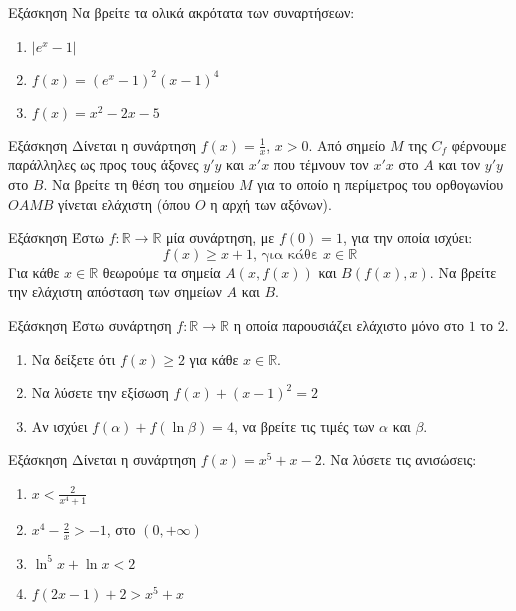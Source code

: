 \documentclass[greek]{beamer}
\begin{document}
\begin{frame}{Εξάσκηση}
 Να βρείτε τα ολικά ακρότατα των συναρτήσεων:
 \begin{enumerate}
  \item $|e^x-1|$ \pause
  \item $f(x)=(e^x-1)^2(x-1)^4$ \pause
  \item $f(x)=x^2-2x-5$
 \end{enumerate}
\end{frame}

\begin{frame}{Εξάσκηση}
 Δίνεται η συνάρτηση $f(x)=\frac{1}{x}$, $x>0$. Από σημείο $Μ$ της $C_f$ φέρνουμε παράλληλες ως προς τους άξονες $y'y$ και $x'x$ που τέμνουν τον $x'x$ στο $Α$ και τον $y'y$ στο $Β$. Να βρείτε τη θέση του σημείου $Μ$ για το οποίο η περίμετρος του ορθογωνίου $ΟΑΜΒ$ γίνεται ελάχιστη (όπου $Ο$ η αρχή των αξόνων).
\end{frame}

\begin{frame}{Εξάσκηση}
 Έστω $f:\mathbb{R}\to\mathbb{R}$ μία συνάρτηση, με $f(0)=1$, για την οποία ισχύει:
 $$f(x)\ge x+1 \text{, για κάθε } x\in\mathbb{R}$$
 Για κάθε $x\in\mathbb{R}$ θεωρούμε τα σημεία $Α(x,f(x))$ και $Β(f(x),x)$. Να βρείτε την ελάχιστη απόσταση των σημείων $Α$ και $Β$.
\end{frame}

\begin{frame}{Εξάσκηση}
 Έστω συνάρτηση $f:\mathbb{R}\to \mathbb{R}$ η οποία παρουσιάζει ελάχιστο μόνο στο $1$ το $2$.
 \begin{enumerate}
  \item Να δείξετε ότι $f(x)\ge 2$ για κάθε $x\in\mathbb{R}$. \pause
  \item Να λύσετε την εξίσωση $f(x)+(x-1)^2=2$ \pause
  \item Αν ισχύει $f(α)+f(\ln β)=4$, να βρείτε τις τιμές των $α$ και $β$.
 \end{enumerate}
\end{frame}

\begin{frame}{Εξάσκηση}
 Δίνεται η συνάρτηση $f(x)=x^5+x-2$. Να λύσετε τις ανισώσεις:
 \begin{enumerate}
  \item $x<\frac{2}{x^4+1}$ \pause
  \item $x^4-\frac{2}{x}>-1$, στο $(0,+\infty)$ \pause
  \item $\ln^5 x+\ln x<2$ \pause
  \item $f(2x-1)+2>x^5+x$
 \end{enumerate}
\end{frame}
\end{document}
